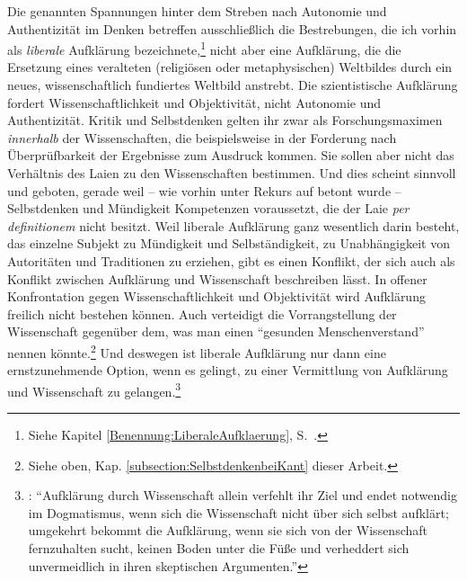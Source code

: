 Die genannten Spannungen hinter dem Streben nach Autonomie und Authentizität im
Denken betreffen ausschließlich die Bestrebungen, die ich vorhin als
\emph{liberale} Aufklärung bezeichnete,\footnote{Siehe Kapitel
\ref{Benennung:LiberaleAufklaerung},
S.~\pageref{Benennung:LiberaleAufklaerung}.} nicht aber eine
 Aufklärung, die die Ersetzung eines veralteten
(religiösen oder metaphysischen) Weltbildes durch ein neues, wissenschaftlich
fundiertes Weltbild anstrebt. Die szientistische Aufklärung fordert
Wissenschaftlichkeit und Objektivität, nicht Autonomie und Authentizität. Kritik
und Selbstdenken gelten ihr zwar als Forschungsmaximen \emph{innerhalb} der
Wissenschaften, die beispielsweise in der Forderung nach Überprüfbarkeit der
Ergebnisse zum Ausdruck kommen. Sie sollen aber nicht das Verhältnis des Laien
zu den Wissenschaften bestimmen. Und dies scheint sinnvoll und geboten, gerade
weil -- wie vorhin unter Rekurs auf
 betont
wurde -- Selbstdenken und Mündigkeit Kompetenzen voraussetzt, die der Laie
\emph{per definitionem} nicht besitzt. Weil liberale Aufklärung ganz wesentlich
darin besteht, das einzelne Subjekt zu Mündigkeit und Selbständigkeit, zu
Unabhängigkeit von Autoritäten und Traditionen zu erziehen, gibt es einen
Konflikt, der sich auch als Konflikt zwischen Aufklärung und Wissenschaft
beschreiben lässt. In offener Konfrontation gegen Wissenschaftlichkeit und
Objektivität wird Aufklärung freilich nicht bestehen können. Auch 
verteidigt die Vorrangstellung der Wissenschaft gegenüber dem, was man einen
\enquote{gesunden Menschenverstand} nennen könnte.\footnote{Siehe oben, Kap.
\ref{subsection:SelbstdenkenbeiKant} dieser Arbeit.} Und deswegen ist liberale Aufklärung nur
dann eine ernstzunehmende Option, wenn es gelingt, zu einer Vermittlung von Aufklärung und Wissenschaft zu
gelangen.\footnote{\cite[Vgl.][837]{Schnaedelbach:WirKantianer2005}:
\enquote{Aufklärung durch Wissenschaft allein verfehlt ihr Ziel und endet
notwendig im Dogmatismus, wenn sich die Wissenschaft nicht über
sich selbst aufklärt; umgekehrt bekommt die Aufklärung, wenn sie sich von der
Wissenschaft fernzuhalten sucht, keinen Boden unter die Füße und verheddert
sich unvermeidlich in ihren skeptischen Argumenten.}}

